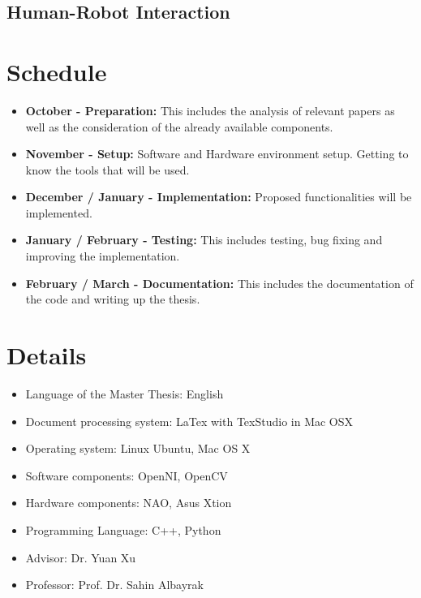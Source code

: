 \section{Human-Robot Interaction}


\chapter{Schedule}
\begin{itemize}
	\item \textbf{October - Preparation:} This includes the analysis of relevant papers as well as the consideration of the already available components.
	\item \textbf{November - Setup:} Software and Hardware environment setup. Getting to know the tools that will be used.
	\item \textbf{December / January - Implementation:} Proposed functionalities will be implemented.
	\item \textbf{January / February - Testing:} This includes testing, bug fixing and improving the implementation.
	\item \textbf{February / March - Documentation:} This includes the documentation of the code and writing up the thesis.
\end{itemize}

\chapter{Details}
\begin{itemize}
	\item Language of the Master Thesis: English
	\item Document processing system: LaTex with TexStudio in Mac OSX
	\item Operating system: Linux Ubuntu, Mac OS X
	\item Software components: OpenNI, OpenCV
	\item Hardware components: NAO, Asus Xtion
	\item Programming Language: C++, Python
	\item Advisor: Dr. Yuan Xu
	\item Professor: Prof. Dr. Sahin Albayrak
\end{itemize}
